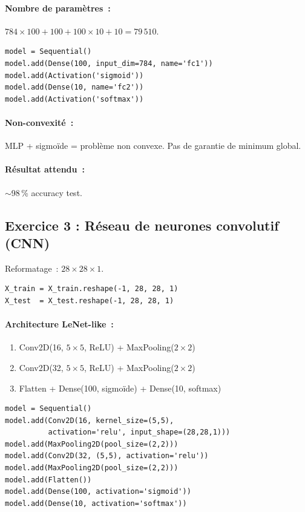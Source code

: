 \documentclass[a4paper,11pt]{article}
\theoremstyle{definition}
\theoremstyle{remark}
\begin{document}
\paragraph{Nombre de param\`etres~:}
$784\times 100 + 100 + 100\times 10 + 10 = 79\,510$.

\begin{lstlisting}
model = Sequential()
model.add(Dense(100, input_dim=784, name='fc1'))
model.add(Activation('sigmoid'))
model.add(Dense(10, name='fc2'))
model.add(Activation('softmax'))
\end{lstlisting}

\paragraph{Non-convexit\'e~:} MLP + sigmo\"ide = probl\`eme non
convexe. Pas de garantie de minimum global.

\paragraph{R\'esultat attendu~:} $\sim$98\,\% accuracy test.

\subsection{Exercice 3 : R\'eseau de neurones convolutif (CNN)}

Reformatage~: $28\times28\times1$.

\begin{lstlisting}
X_train = X_train.reshape(-1, 28, 28, 1)
X_test  = X_test.reshape(-1, 28, 28, 1)
\end{lstlisting}

\paragraph{Architecture LeNet-like~:}
\begin{enumerate}
  \item Conv2D(16, $5\times5$, ReLU) + MaxPooling($2\times2$)
  \item Conv2D(32, $5\times5$, ReLU) + MaxPooling($2\times2$)
  \item Flatten + Dense(100, sigmo\"ide) + Dense(10, softmax)
\end{enumerate}

\begin{lstlisting}
model = Sequential()
model.add(Conv2D(16, kernel_size=(5,5),
          activation='relu', input_shape=(28,28,1)))
model.add(MaxPooling2D(pool_size=(2,2)))
model.add(Conv2D(32, (5,5), activation='relu'))
model.add(MaxPooling2D(pool_size=(2,2)))
model.add(Flatten())
model.add(Dense(100, activation='sigmoid'))
model.add(Dense(10, activation='softmax'))
\end{lstlisting}
\end{document}

